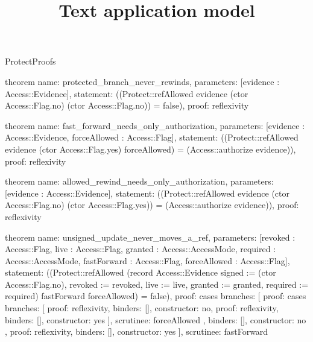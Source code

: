 \begin{lexlean}{ProtectProofs}
\title{Text application model}
\begin{semanticmodule}
theorem{
  name: protected_branch_never_rewinds,
  parameters: [evidence : Access::Evidence],
  statement: ((Protect::refAllowed evidence (ctor Access::Flag.no) (ctor Access::Flag.no)) = false),
  proof: reflexivity{}
}

theorem{
  name: fast_forward_needs_only_authorization,
  parameters: [evidence : Access::Evidence, forceAllowed : Access::Flag],
  statement: ((Protect::refAllowed evidence (ctor Access::Flag.yes) forceAllowed) = (Access::authorize evidence)),
  proof: reflexivity{}
}

theorem{
  name: allowed_rewind_needs_only_authorization,
  parameters: [evidence : Access::Evidence],
  statement: ((Protect::refAllowed evidence (ctor Access::Flag.no) (ctor Access::Flag.yes)) = (Access::authorize evidence)),
  proof: reflexivity{}
}

theorem{
  name: unsigned_update_never_moves_a_ref,
  parameters: [revoked : Access::Flag, live : Access::Flag, granted : Access::AccessMode, required : Access::AccessMode, fastForward : Access::Flag, forceAllowed : Access::Flag],
  statement: ((Protect::refAllowed (record Access::Evidence {signed := (ctor Access::Flag.no), revoked := revoked, live := live, granted := granted, required := required}) fastForward forceAllowed) = false),
  proof: cases{
    branches: [
      {
        proof: cases{
          branches: [
            {proof: reflexivity{}, binders: [], constructor: no},
            {proof: reflexivity{}, binders: [], constructor: yes}
          ],
          scrutinee: forceAllowed
        },
        binders: [],
        constructor: no
      },
      {proof: reflexivity{}, binders: [], constructor: yes}
    ],
    scrutinee: fastForward
  }
}
\end{semanticmodule}
\end{lexlean}
